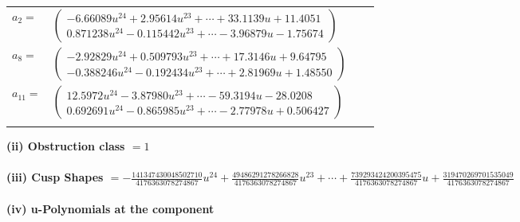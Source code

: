 \documentclass[1p]{elsarticle_modified}
\theoremstyle{definition}
\begin{document}
\begin{tabular}{m{7pt} m{180pt} m{7pt} m{180pt} }
\flushright $a_{2}=$&$\begin{pmatrix}-6.66089 u^{24}+2.95614 u^{23}+\cdots+33.1139 u+11.4051\\0.871238 u^{24}-0.115442 u^{23}+\cdots-3.96879 u-1.75674\end{pmatrix}$ \\
\flushright $a_{8}=$&$\begin{pmatrix}-2.92829 u^{24}+0.509793 u^{23}+\cdots+17.3146 u+9.64795\\-0.388246 u^{24}-0.192434 u^{23}+\cdots+2.81969 u+1.48550\end{pmatrix}$ \\
\flushright $a_{11}=$&$\begin{pmatrix}12.5972 u^{24}-3.87980 u^{23}+\cdots-59.3194 u-28.0208\\0.692691 u^{24}-0.865985 u^{23}+\cdots-2.77978 u+0.506427\end{pmatrix}$\\&\end{tabular}
\flushleft \textbf{(ii) Obstruction class $= 1$}\\~\\
\flushleft \textbf{(iii) Cusp Shapes $= -\frac{141347430048502710}{4176363078274867} u^{24}+\frac{49486291278266828}{4176363078274867} u^{23}+\cdots+\frac{739293424200395475}{4176363078274867} u+\frac{319470269701535049}{4176363078274867}$}\\~\\
\newpage\renewcommand{\arraystretch}{1}
\flushleft \textbf{(iv) u-Polynomials at the component}\newline \\
\end{document}
